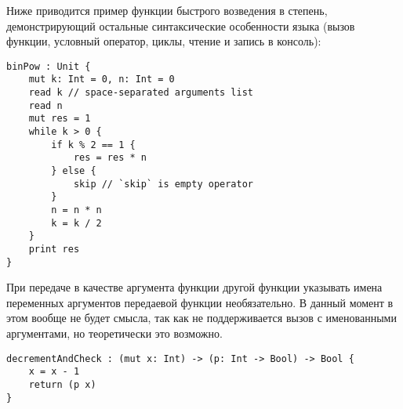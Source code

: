 \documentclass[11pt,a4paper]{article}
\begin{document}
Ниже приводится пример функции быстрого возведения в степень, демонстрирующий остальные синтаксические особенности языка (вызов функции, условный оператор, циклы, чтение и запись в консоль):

\begin{lstlisting}[caption=Бинарное возведение в степень]
binPow : Unit {
    mut k: Int = 0, n: Int = 0
    read k // space-separated arguments list
    read n
    mut res = 1
    while k > 0 {
        if k % 2 == 1 {  
            res = res * n
        } else {
            skip // `skip` is empty operator
        }
        n = n * n
        k = k / 2
    }
    print res
}
\end{lstlisting}

При передаче в качестве аргумента функции другой функции указывать имена переменных аргументов передаевой функции необязательно. В данный момент в этом вообще не будет смысла, так как не поддерживается вызов с именованными аргументами, но теоретически это возможно.\\

\begin{lstlisting}[caption=Передача функции в качестве аргумента]
decrementAndCheck : (mut x: Int) -> (p: Int -> Bool) -> Bool {
    x = x - 1
    return (p x)  
}
\end{lstlisting}
\end{document}
